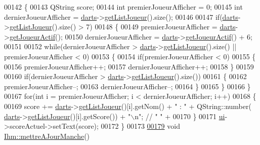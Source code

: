 \begin{DoxyCode}
00142 \{
00143     QString score;
00144     \textcolor{keywordtype}{int} premierJoueurAfficher = 0;
00145     \textcolor{keywordtype}{int} dernierJoueurAfficher = \hyperlink{class_ihm_a2a0f54d33f4d6b2531ec2190c4a2356e}{darts}->\hyperlink{class_darts_a0525b09703d3461bf5570197354743c3}{getListJoueur}().size();
00146 
00147     \textcolor{keywordflow}{if}(\hyperlink{class_ihm_a2a0f54d33f4d6b2531ec2190c4a2356e}{darts}->\hyperlink{class_darts_a0525b09703d3461bf5570197354743c3}{getListJoueur}().size() > 7)
00148     \{
00149         premierJoueurAfficher = \hyperlink{class_ihm_a2a0f54d33f4d6b2531ec2190c4a2356e}{darts}->\hyperlink{class_darts_a20ddfd28c8355c06a90cc23abff3de11}{getJoueurActif}();
00150         dernierJoueurAfficher = \hyperlink{class_ihm_a2a0f54d33f4d6b2531ec2190c4a2356e}{darts}->\hyperlink{class_darts_a20ddfd28c8355c06a90cc23abff3de11}{getJoueurActif}() + 6;
00151 
00152         \textcolor{keywordflow}{while}(dernierJoueurAfficher > \hyperlink{class_ihm_a2a0f54d33f4d6b2531ec2190c4a2356e}{darts}->\hyperlink{class_darts_a0525b09703d3461bf5570197354743c3}{getListJoueur}().size() || 
      premierJoueurAfficher < 0)
00153         \{
00154             \textcolor{keywordflow}{if}(premierJoueurAfficher < 0)
00155             \{
00156                 premierJoueurAfficher++;
00157                 dernierJoueurAfficher++;
00158             \}
00159 
00160             \textcolor{keywordflow}{if}(dernierJoueurAfficher > \hyperlink{class_ihm_a2a0f54d33f4d6b2531ec2190c4a2356e}{darts}->\hyperlink{class_darts_a0525b09703d3461bf5570197354743c3}{getListJoueur}().size())
00161             \{
00162                 premierJoueurAfficher--;
00163                 dernierJoueurAfficher--;
00164             \}
00165         \}
00166     \}
00167     \textcolor{keywordflow}{for}(\textcolor{keywordtype}{int} i = premierJoueurAfficher; i < dernierJoueurAfficher; i++)
00168     \{
00169         score += \hyperlink{class_ihm_a2a0f54d33f4d6b2531ec2190c4a2356e}{darts}->\hyperlink{class_darts_a0525b09703d3461bf5570197354743c3}{getListJoueur}()[i].getNom() + \textcolor{stringliteral}{" : "} + QString::number(
      \hyperlink{class_ihm_a2a0f54d33f4d6b2531ec2190c4a2356e}{darts}->\hyperlink{class_darts_a0525b09703d3461bf5570197354743c3}{getListJoueur}()[i].getScore()) + \textcolor{stringliteral}{"\(\backslash\)n"}; \textcolor{comment}{// "         " +}
00170     \}
00171     \hyperlink{class_ihm_a0ac5f47856566ceeeca1720109bf70ea}{ui}->scoreActuel->setText(score);
00172 \}
00173 
\hyperlink{class_ihm_a3b41d92919b87966f903b22863dc6acb}{00179} \textcolor{keywordtype}{void} \hyperlink{class_ihm_a3b41d92919b87966f903b22863dc6acb}{Ihm::mettreAJourManche}()

\end{DoxyCode}
